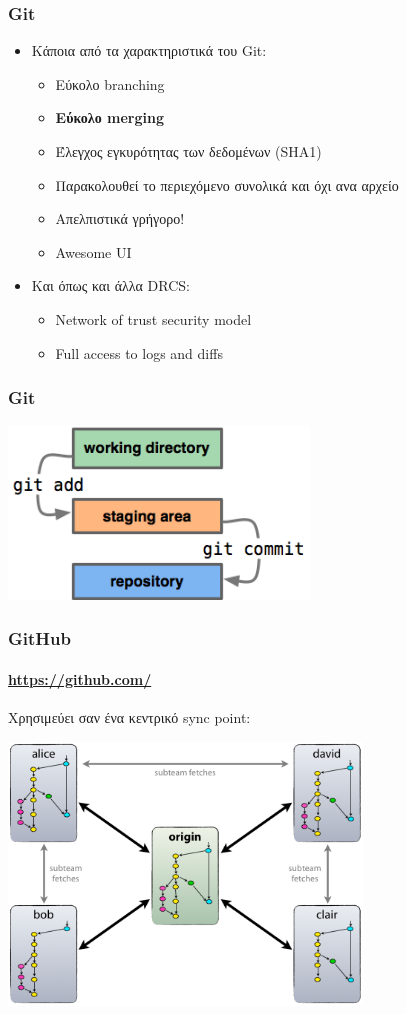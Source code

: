 \documentclass[]{beamer}
\begin{document}
\begin{frame}
  \frametitle{Git}
  \begin{itemize}
    \item Κάποια από τα χαρακτηριστικά του Git:
      \begin{itemize}
        \item Εύκολο branching \pause
        \item \textbf{Εύκολο merging} \pause
        \item Έλεγχος εγκυρότητας των δεδομένων (SHA1) \pause
        \item Παρακολουθεί το περιεχόμενο συνολικά και όχι ανα αρχείο \pause
        \item Απελπιστικά γρήγορο! \pause
        \item Awesome UI \pause
      \end{itemize}
    \item Και όπως και άλλα DRCS: \pause
      \begin{itemize}
        \item Network of trust security model \pause
        \item Full access to logs and diffs
      \end{itemize}
  \end{itemize}
\end{frame}

\begin{frame}
  \frametitle{Git}
  \begin{center}
    \includegraphics[width=8cm]{index1.png}
  \end{center}
\end{frame}

\begin{frame}
  \frametitle{GitHub}
  \framesubtitle{\url{https://github.com/}}
  Χρησιμεύει σαν ένα κεντρικό sync point:
  \begin{center}
    \includegraphics[height=7cm]{centr-decentr.png}
  \end{center}
\end{frame}
\end{document}
